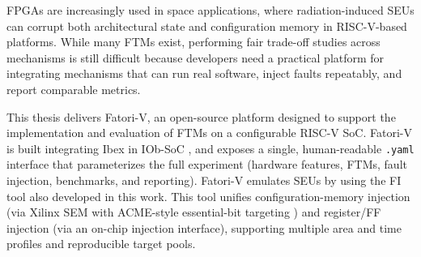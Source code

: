 \acresetall

\Acp{FPGA} are increasingly used in space applications, where radiation-induced \acp{SEU} can corrupt both architectural state and configuration memory in \ac{RISC-V}-based platforms. While many \acp{FTM} exist, performing fair trade-off studies across mechanisms is still difficult because developers need a practical platform for integrating mechanisms that can run real software, inject faults repeatably, and report comparable metrics.

This thesis delivers \ac{Fatori-V}, an open-source platform designed to support the implementation and evaluation of \acp{FTM} on a configurable \ac{RISC-V} \ac{SoC}. \ac{Fatori-V} is built integrating Ibex \cite{ibex} in IOb-SoC \cite{iob-soc}, and exposes a single, human-readable \texttt{.yaml} interface that parameterizes the full experiment (hardware features, \acp{FTM}, fault injection, benchmarks, and reporting). \ac{Fatori-V} emulates \acp{SEU} by using the \ac{FI} tool also developed in this work. This tool unifies configuration-memory injection (via Xilinx \ac{SEM} with ACME-style essential-bit targeting \cite{SEM,ACME}) and register/\ac{FF} injection (via an on-chip injection interface), supporting multiple area and time profiles and reproducible target pools. 
